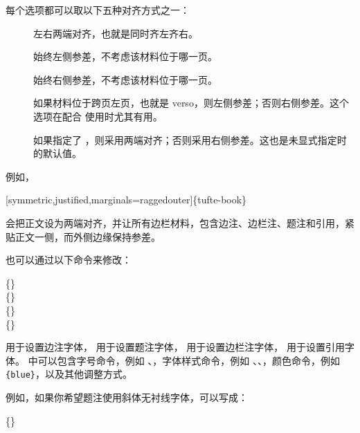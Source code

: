 每个选项都可以取以下五种对齐方式之一：
\begin{description}
  \item[] 左右两端对齐，也就是同时齐左齐右。
  \item[] 始终左侧参差，不考虑该材料位于哪一页。
  \item[] 始终右侧参差，不考虑该材料位于哪一页。
  \item[] 如果材料位于跨页左页，也就是 verso，则左侧参差；否则右侧参差。这个选项在配合  使用时尤其有用。
  \item[] 如果指定了 ，则采用两端对齐；否则采用右侧参差。这也是未显式指定时的默认值。
\end{description}

\noindent 例如，
\begin{docspec}
  [symmetric,justified,marginals=raggedouter]\{tufte-book\}
\end{docspec}
会把正文设为两端对齐，并让所有边栏材料，包含边注、边栏注、题注和引用，紧贴正文一侧，而外侧边缘保持参差。

也可以通过以下命令来修改：

\begin{docspec}
  \{\}\\
  \{\}\\
  \{\}\\
  \{\}
\end{docspec}

 用于设置边注字体， 用于设置题注字体， 用于设置边栏注字体， 用于设置引用字体。 中可以包含字号命令，例如 、，字体样式命令，例如 、、，颜色命令，例如 \texttt{\{blue\}}，以及其他调整方式。

例如，如果你希望题注使用斜体无衬线字体，可以写成：
\begin{docspec}
  \{\}
\end{docspec}
